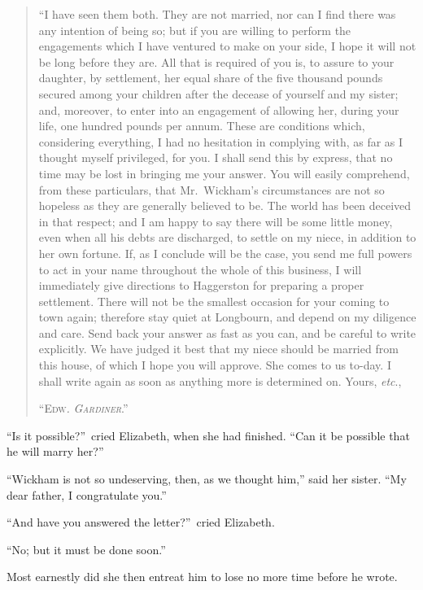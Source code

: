 \documentclass[12pt,english,oneside]{book}
\newcommand{\noun}[1]{\textsc{#1}}
\begin{document}
\begin{quotation}
\noindent {}``I have seen them both. They are not married, nor can
I find there was any intention of being so; but if you are willing
to perform the engagements which I have ventured to make on your side,
I hope it will not be long before they are. All that is required of
you is, to assure to your daughter, by settlement, her equal share
of the five thousand pounds secured among your children after the
decease of yourself and my sister; and, moreover, to enter into an
engagement of allowing her, during your life, one hundred pounds per
annum. These are conditions which, considering everything, I had no
hesitation in complying with, as far as I thought myself privileged,
for you. I shall send this by express, that no time may be lost in
bringing me your answer. You will easily comprehend, from these particulars,
that Mr.\ Wickham's circumstances are not so hopeless as they are
generally believed to be. The world has been deceived in that respect;
and I am happy to say there will be some little money, even when all
his debts are discharged, to settle on my niece, in addition to her
own fortune. If, as I conclude will be the case, you send me full
powers to act in your name throughout the whole of this business,
I will immediately give directions to Haggerston for preparing a proper
settlement. There will not be the smallest occasion for your coming
to town again; therefore stay quiet at Longbourn, and depend on my
diligence and care. Send back your answer as fast as you can, and
be careful to write explicitly. We have judged it best that my niece
should be married from this house, of which I hope you will approve.
She comes to us to-day. I shall write again as soon as anything more
is determined on. Yours, \textit{etc}.,

``\noun{Edw}\emph{\noun{.}} \textit{\emph{\noun{Gardiner}}}.'' 
\end{quotation}
{}``Is it possible?''\ cried Elizabeth, when she had finished.
{}``Can it be possible that he will marry her?''\ 

{}``Wickham is not so undeserving, then, as we thought him,'' said
her sister. {}``My dear father, I congratulate you.''

{}``And have you answered the letter?''\ cried Elizabeth.

{}``No; but it must be done soon.''

Most earnestly did she then entreat him to lose no more time before
he wrote.
\end{document}
